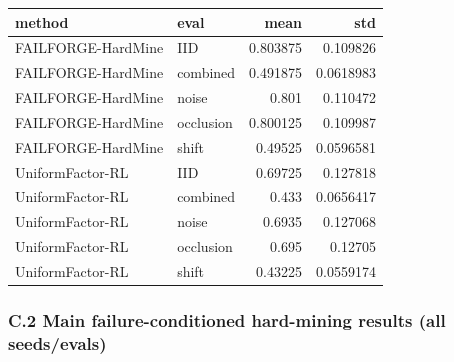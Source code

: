 \documentclass[
]{article}
\begin{document}
\begin{longtable}[]{@{}llrr@{}}
\toprule\noalign{}
method & eval & mean & std \\
\midrule\noalign{}
\endhead
\bottomrule\noalign{}
\endlastfoot
FAILFORGE-HardMine & IID & 0.803875 & 0.109826 \\
FAILFORGE-HardMine & combined & 0.491875 & 0.0618983 \\
FAILFORGE-HardMine & noise & 0.801 & 0.110472 \\
FAILFORGE-HardMine & occlusion & 0.800125 & 0.109987 \\
FAILFORGE-HardMine & shift & 0.49525 & 0.0596581 \\
UniformFactor-RL & IID & 0.69725 & 0.127818 \\
UniformFactor-RL & combined & 0.433 & 0.0656417 \\
UniformFactor-RL & noise & 0.6935 & 0.127068 \\
UniformFactor-RL & occlusion & 0.695 & 0.12705 \\
UniformFactor-RL & shift & 0.43225 & 0.0559174 \\
\end{longtable}

\subsubsection{C.2 Main failure-conditioned hard-mining results (all
seeds/evals)}\label{c.2-main-failure-conditioned-hard-mining-results-all-seedsevals}
\end{document}
